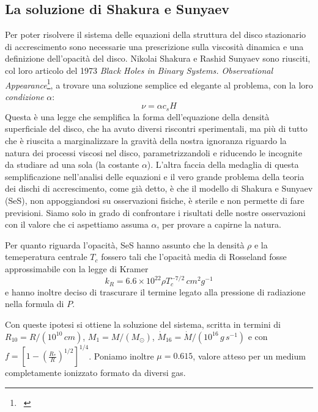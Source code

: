 \documentclass[a4paperbi]{article}
\begin{document}
\subsection{La soluzione di Shakura e Sunyaev}
	Per poter risolvere il sistema delle equazioni della struttura del disco stazionario di accrescimento sono necessarie una prescrizione sulla viscosità dinamica e una definizione dell'opacità del disco. Nikolai Shakura e Rashid Sunyaev sono riusciti, col loro articolo del 1973 \textit{Black Holes in Binary Systems. Observational Appearance}\footnote{~\cite{ShakuraSunyaev1973}}, a trovare una soluzione semplice ed elegante al problema, con la loro \textit{condizione} $\alpha$:
	\begin{equation}
		\nu=\alpha c_sH
	\end{equation}
Questa è una legge che semplifica la forma dell'equazione della densità superficiale del disco, che ha avuto diversi riscontri sperimentali, ma più di tutto che è riuscita a marginalizzare la gravità della nostra ignoranza riguardo la natura dei processi viscosi nel disco, parametrizzandoli e riducendo le incognite da studiare ad una sola (la costante $\alpha$). L'altra faccia della medaglia di questa semplificazione nell'analisi delle equazioni e il vero grande problema della teoria dei dischi di accrescimento, come già detto, è che il modello di Shakura e Sunyaev (SeS), non appoggiandosi su osservazioni fisiche, è sterile e non permette di fare previsioni. Siamo solo in grado di confrontare i risultati delle nostre osservazioni con il valore che ci aspettiamo assuma $\alpha$, per provare a capirne la natura.

Per quanto riguarda l'opacità, SeS hanno assunto che la densità $\rho$ e la temeperatura centrale $T_c$ fossero tali che l'opacità media di Rosseland fosse approssimabile con la legge di Kramer
\begin{equation}
	k_R=6.6\times10^{22}\rho T_c^{-7/2}\,cm^2g^{-1}
\end{equation}
e hanno inoltre deciso di trascurare il termine legato alla pressione di radiazione nella formula di $P$.

Con queste ipotesi si ottiene la soluzione del sistema, scritta in termini di $R_{10}=R/(10^{10}\,cm)$, $M_{1}=M/(M_\odot)$, $\dot{M}_{16}=\dot{M}/(10^{16}\,g\,s^{-1})$ e con $f=\left[1-\left(\frac{R_*}{R}\right)^{1/2}\right]^{1/4}$. Poniamo inoltre $\mu=0.615$, valore atteso per un medium completamente ionizzato formato da diversi gas. 
\end{document}

